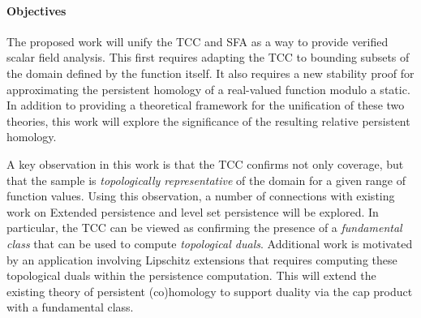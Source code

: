 \paragraph{Objectives}

The proposed work will unify the TCC and SFA as a way to provide verified scalar field analysis.
This first requires adapting the TCC to bounding subsets of the domain defined by the function itself.
It also requires a new stability proof for approximating the persistent homology of a real-valued function modulo a static.
In addition to providing a theoretical framework for the unification of these two theories, this work will explore the significance of the resulting relative persistent homology.

A key observation in this work is that the TCC confirms not only coverage, but that the sample is \emph{topologically representative} of the domain for a given range of function values.
Using this observation, a number of connections with existing work on Extended persistence and level set persistence will be explored.
In particular, the TCC can be viewed as confirming the presence of a \emph{fundamental class} that can be used to compute \emph{topological duals}.
Additional work is motivated by an application involving Lipschitz extensions that requires computing these topological duals within the persistence computation.
This will extend the existing theory of persistent (co)homology to support duality via the cap product with a fundamental class.

%
%
